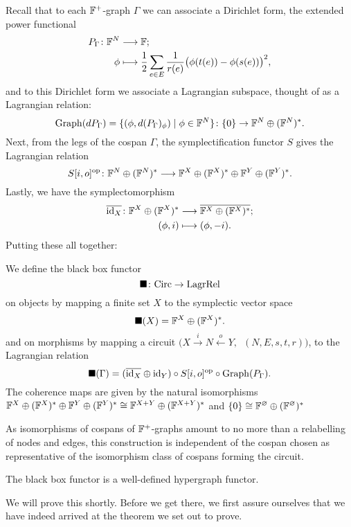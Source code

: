 Recall that to each ${\mathbb F}^+$-graph $\Gamma$ we can associate a Dirichlet form, 
the extended power functional 
\begin{align*}
  P_\Gamma{\colon} {\mathbb F}^N &\longrightarrow {\mathbb F}; \\
  \phi &\longmapsto \frac{1}{2} \sum_{e \in E} \frac{1}{r(e)} \big( \phi(t(e)) -
  \phi(s(e))  \big)^2,
\end{align*}
and to this Dirichlet form we associate a Lagrangian subspace, thought of as a
Lagrangian relation:
\[
  \mathrm{Graph}(dP_\Gamma) = \{(\phi,d(P_\Gamma)_\phi) \mid \phi \in
  {\mathbb F}^N\}{\colon} \{0\} \to {\mathbb F}^N \oplus ({\mathbb F}^N)^\ast.
\]
Next, from the legs of the cospan $\Gamma$, the symplectification functor $S$
gives the Lagrangian relation
\[
  S[i,o]^{\mathrm{op}}{\colon} {\mathbb F}^N \oplus ({\mathbb F}^N)^\ast \longrightarrow {\mathbb F}^X \oplus
  ({\mathbb F}^X)^\ast \oplus {\mathbb F}^Y \oplus ({\mathbb F}^Y)^\ast.
\]
Lastly, we have the symplectomorphism
\begin{align*}
  \overline{\mathrm{id}_X}{\colon} {\mathbb F}^X \oplus ({\mathbb F}^X)^\ast &\longrightarrow \overline{{\mathbb F}^X \oplus
  ({\mathbb F}^X)^\ast}; \\
  (\phi,i) &\longmapsto (\phi,-i).
\end{align*}
Putting these all together:
\begin{definition}
  We define the black box functor 
  \[
    \blacksquare{\colon} \mathrm{Circ} \to \mathrm{LagrRel} 
  \]
  on objects by mapping a finite set $X$ to the symplectic vector space 
  \[
    \blacksquare(X) = {\mathbb F}^X \oplus ({\mathbb F}^X)^\ast.
  \]
  and on morphisms by mapping a circuit $\big(X \stackrel{i}\to N
  \stackrel{o}\leftarrow Y, \enspace (N,E,s,t,r)\big)$, to the Lagrangian
  relation
  \[
    \blacksquare(\Gamma) = (\overline{\mathrm{id}_X}\oplus \mathrm{id}_Y) \circ S[i,o]^{\mathrm{op}}
    \circ \mathrm{Graph}(P_\Gamma).
  \]
  The coherence maps are given by the natural isomorphisms ${\mathbb F}^X \oplus
  ({\mathbb F}^X)^\ast \oplus {\mathbb F}^Y \oplus ({\mathbb F}^Y)^\ast \cong {\mathbb F}^{X+Y} \oplus
  ({\mathbb F}^{X+Y})^\ast$ and $\{0\} \cong {\mathbb F}^\varnothing \oplus ({\mathbb F}^\varnothing)^\ast$
\end{definition}

As isomorphisms of cospans of ${\mathbb F}^+$-graphs amount to no more than a 
relabelling of nodes and edges, this construction is independent of the cospan 
chosen as representative of the isomorphism class of cospans forming the 
circuit.

\begin{theorem} \label{thm:main}
  The black box functor is a well-defined hypergraph functor.
\end{theorem}

We will prove this shortly. Before we get there, we first assure ourselves that
we have indeed arrived at the theorem we set out to prove.

